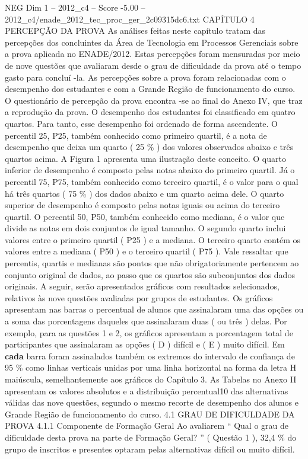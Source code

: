 \begin{textsample}{NEG Dim 1 – 2012\_c4 – Score -5.00 – 2012\_c4/enade\_2012\_tec\_proc\_ger\_2c09315dc6.txt}  \label{ex:f1_neg_073}
CAPÍTULO 4 PERCEPÇÃO DA PROVA As análises feitas neste capítulo tratam das percepções dos concluintes da Área de Tecnologia em Processos Gerenciais sobre a prova aplicada no ENADE/2012.
Estas percepções foram mensuradas por meio de nove questões que avaliaram desde o grau de dificuldade da prova até o tempo gasto para concluí -la.
As percepções sobre a prova foram relacionadas com o desempenho dos estudantes e com a Grande Região de funcionamento do curso.
O questionário de percepção da prova encontra -se ao final do Anexo IV, que traz a reprodução da prova.
O desempenho dos estudantes foi classificado em quatro quartos.
Para tanto, esse desempenho foi ordenado de forma ascendente.
O percentil 25, P25, também conhecido como primeiro quartil, é a nota de desempenho que deixa um quarto ( 25 \% ) dos valores observados abaixo e três quartos acima.
A Figura 1 apresenta uma ilustração deste conceito.
O quarto inferior de desempenho é composto pelas notas abaixo do primeiro quartil.
Já o percentil 75, P75, também conhecido como terceiro quartil, é o valor para o qual há três quartos ( 75 \% ) dos dados abaixo e um quarto acima dele.
O quarto superior de desempenho é composto pelas notas iguais ou acima do terceiro quartil.
O percentil 50, P50, também conhecido como mediana, é o valor que divide as notas em dois conjuntos de igual tamanho.
O segundo quarto inclui valores entre o primeiro quartil ( P25 ) e a mediana.
O terceiro quarto contém os valores entre a mediana ( P50 ) e o terceiro quartil ( P75 ).
Vale ressaltar que percentis, quartis e medianas são pontos que não obrigatoriamente pertencem ao conjunto original de dados, ao passo que os quartos são subconjuntos dos dados originais.
A seguir, serão apresentados gráficos com resultados selecionados, relativos às nove questões avaliadas por grupos de estudantes.
Os gráficos apresentam nas barras o percentual de alunos que assinalaram uma das opções ou a soma das porcentagens daqueles que assinalaram duas ( ou três ) delas.
Por exemplo, para as questões 1 e 2, os gráficos apresentam a porcentagem total de participantes que assinalaram as opções ( D ) difícil e ( E ) muito difícil.
Em \textbf{cada} barra foram assinalados também os extremos do intervalo de confiança de 95 \% como linhas verticais unidas por uma linha horizontal na forma da letra H maiúscula, semelhantemente aos gráficos do Capítulo 3.
As Tabelas no Anexo II apresentam os valores absolutos e a distribuição percentual10 das alternativas válidas das nove questões, segundo o mesmo recorte de desempenho dos alunos e Grande Região de funcionamento do curso. 4.1 GRAU DE DIFICULDADE DA PROVA 4.1.1 Componente de Formação Geral Ao avaliarem “ Qual o grau de dificuldade desta prova na parte de Formação Geral? ” ( Questão 1 ), 32,4 \% do grupo de inscritos e presentes optaram pelas alternativas difícil ou muito difícil.

\end{textsample}

